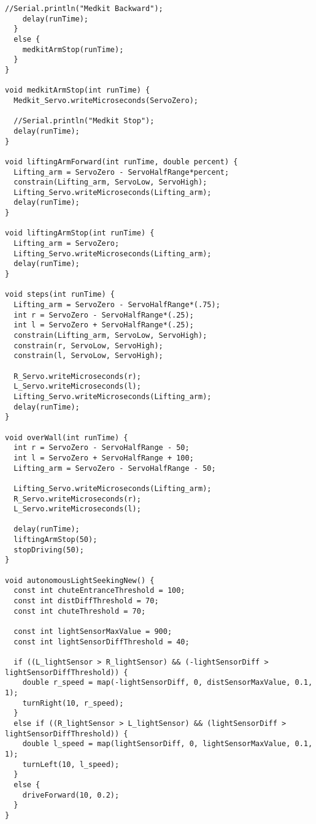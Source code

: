 \begin{lstlisting}[style=myArduino]
    //Serial.println("Medkit Backward");
    delay(runTime);
  }
  else {
    medkitArmStop(runTime);
  }
}

void medkitArmStop(int runTime) {
  Medkit_Servo.writeMicroseconds(ServoZero);

  //Serial.println("Medkit Stop");
  delay(runTime);
}

void liftingArmForward(int runTime, double percent) {
  Lifting_arm = ServoZero - ServoHalfRange*percent;
  constrain(Lifting_arm, ServoLow, ServoHigh);
  Lifting_Servo.writeMicroseconds(Lifting_arm);
  delay(runTime);
}

void liftingArmStop(int runTime) {
  Lifting_arm = ServoZero;
  Lifting_Servo.writeMicroseconds(Lifting_arm);
  delay(runTime);
}

void steps(int runTime) {
  Lifting_arm = ServoZero - ServoHalfRange*(.75);
  int r = ServoZero - ServoHalfRange*(.25);
  int l = ServoZero + ServoHalfRange*(.25);
  constrain(Lifting_arm, ServoLow, ServoHigh);
  constrain(r, ServoLow, ServoHigh);
  constrain(l, ServoLow, ServoHigh);

  R_Servo.writeMicroseconds(r);
  L_Servo.writeMicroseconds(l);
  Lifting_Servo.writeMicroseconds(Lifting_arm);
  delay(runTime);
}

void overWall(int runTime) {
  int r = ServoZero - ServoHalfRange - 50;
  int l = ServoZero + ServoHalfRange + 100;
  Lifting_arm = ServoZero - ServoHalfRange - 50;

  Lifting_Servo.writeMicroseconds(Lifting_arm);
  R_Servo.writeMicroseconds(r);
  L_Servo.writeMicroseconds(l);
  
  delay(runTime);
  liftingArmStop(50);
  stopDriving(50);
}

void autonomousLightSeekingNew() {
  const int chuteEntranceThreshold = 100;
  const int distDiffThreshold = 70;
  const int chuteThreshold = 70;

  const int lightSensorMaxValue = 900;
  const int lightSensorDiffThreshold = 40;

  if ((L_lightSensor > R_lightSensor) && (-lightSensorDiff > lightSensorDiffThreshold)) {
    double r_speed = map(-lightSensorDiff, 0, distSensorMaxValue, 0.1, 1);
    turnRight(10, r_speed);
  }
  else if ((R_lightSensor > L_lightSensor) && (lightSensorDiff > lightSensorDiffThreshold)) {
    double l_speed = map(lightSensorDiff, 0, lightSensorMaxValue, 0.1, 1);
    turnLeft(10, l_speed);
  }
  else {
    driveForward(10, 0.2);
  }
}


\end{lstlisting}
